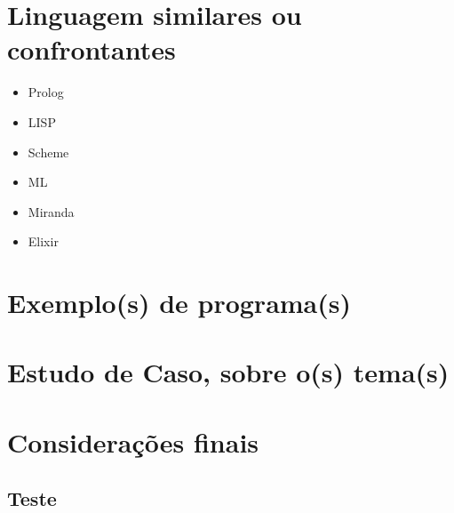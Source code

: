 \documentclass[12pt,openright,a4paper,brazil]{abntex2}
\begin{document}
    \chapter{Linguagem similares ou confrontantes}

    \begin{itemize}
      \item Prolog
      \item LISP 
      \item Scheme 
      \item ML 
      \item Miranda 
      \item Elixir 
    \end{itemize}

    \chapter{Exemplo(s) de programa(s)}
    \chapter{Estudo de Caso, sobre o(s) tema(s)}
    \chapter{Considerações finais}

    \begin{apendicesenv}

        \partapendices
        \chapter{Teste}
    
    \end{apendicesenv}
\end{document}
